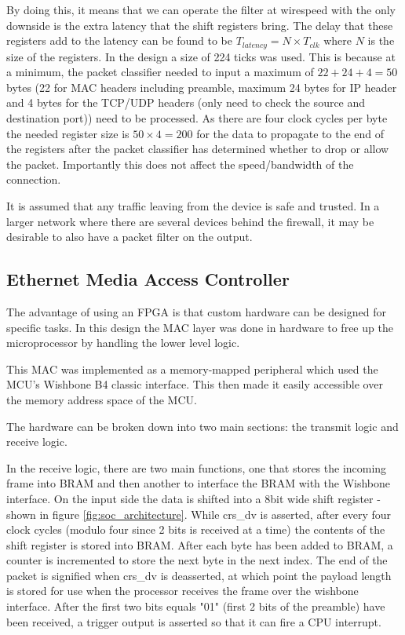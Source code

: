 By doing this, it means that we can operate the filter at wirespeed with the only downside is the extra latency that the shift registers bring. The delay that these registers add to the latency can be found to be $T_{latency} = N\times T_{clk}$ where $N$ is the size of the registers. In the design a size of 224 ticks was used. This is because at a minimum, the packet classifier needed to input a maximum of $22 + 24 + 4 = 50$ bytes (22 for MAC headers including preamble, maximum 24 bytes for IP header and 4 bytes for the TCP/UDP headers (only need to check the source and destination port)) need to be processed. As there are four clock cycles per byte the needed register size is $50 \times 4=200$ for the data to propagate to the end of the registers after the packet classifier has determined whether to drop or allow the packet. Importantly this does not affect the speed/bandwidth of the connection. 


It is assumed that any traffic leaving from the device is safe and trusted. In a larger network where there are several devices behind the firewall, it may be desirable to also have a packet filter on the output. 










\subsection{Ethernet Media Access Controller}
\label{sec:ethernet_mac}
The advantage of using an FPGA is that custom hardware can be designed for specific tasks. In this design the MAC layer was done in hardware to free up the microprocessor by handling the lower level logic. 

This MAC was implemented as a memory-mapped peripheral which used the MCU's Wishbone B4 classic interface. This then made it easily accessible over the memory address space of the MCU.  



The hardware can be broken down into two main sections: the transmit logic and receive logic. 

In the receive logic, there are two main functions, one that stores the incoming frame into BRAM and then another to interface the BRAM with the Wishbone interface. On the input side the data is shifted into a 8bit wide shift register - shown in figure \ref{fig:soc_architecture}. While crs\_dv is asserted, after every four clock cycles (modulo four since 2 bits is received at a time) the contents of the shift register is stored into BRAM. After each byte has been added to BRAM, a counter is incremented to store the next byte in the next index. The end of the packet is signified when crs\_dv is deasserted, at which point the payload length is stored for use when the processor receives the frame over the wishbone interface. After the first two bits equals "01" (first 2 bits of the preamble) have been received, a trigger output is asserted so that it can fire a CPU interrupt.

